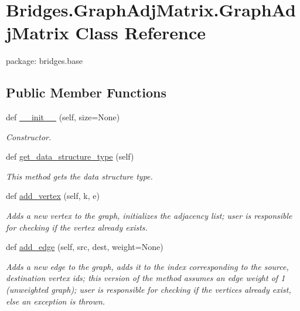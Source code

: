 \hypertarget{class_bridges_1_1_graph_adj_matrix_1_1_graph_adj_matrix}{}\section{Bridges.\+Graph\+Adj\+Matrix.\+Graph\+Adj\+Matrix Class Reference}
\label{class_bridges_1_1_graph_adj_matrix_1_1_graph_adj_matrix}


package\+: bridges.\+base  


\subsection*{Public Member Functions}
\begin{DoxyCompactItemize}
\item 
def \mbox{\hyperlink{class_bridges_1_1_graph_adj_matrix_1_1_graph_adj_matrix_adba83cb630fd41002e8bff1c57ec3555}{\+\_\+\+\_\+init\+\_\+\+\_\+}} (self, size=None)
\begin{DoxyCompactList}\small\item\em Constructor. \end{DoxyCompactList}\item 
def \mbox{\hyperlink{class_bridges_1_1_graph_adj_matrix_1_1_graph_adj_matrix_af0d8c932f0c8b3c711b80cae50134846}{get\+\_\+data\+\_\+structure\+\_\+type}} (self)
\begin{DoxyCompactList}\small\item\em This method gets the data structure type. \end{DoxyCompactList}\item 
def \mbox{\hyperlink{class_bridges_1_1_graph_adj_matrix_1_1_graph_adj_matrix_a2fe88ea2d4d6e60bebd80b17293b3fed}{add\+\_\+vertex}} (self, k, e)
\begin{DoxyCompactList}\small\item\em Adds a new vertex to the graph, initializes the adjacency list; user is responsible for checking if the vertex already exists. \end{DoxyCompactList}\item 
def \mbox{\hyperlink{class_bridges_1_1_graph_adj_matrix_1_1_graph_adj_matrix_aa3d632cff48b735232dc91e22534125f}{add\+\_\+edge}} (self, src, dest, weight=None)
\begin{DoxyCompactList}\small\item\em Adds a new edge to the graph, adds it to the index corresponding to the source, destination vertex ids; this version of the method assumes an edge weight of 1 (unweighted graph); user is responsible for checking if the vertices already exist, else an exception is thrown. \end{DoxyCompactList}\item 

\end{DoxyCompactItemize}
